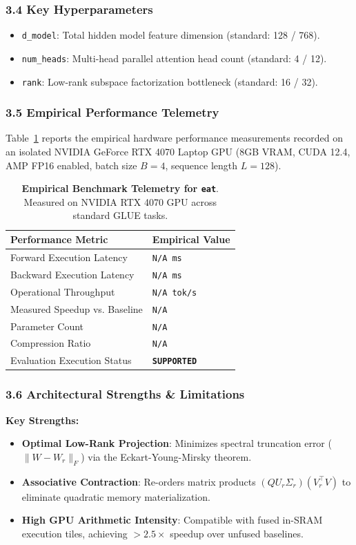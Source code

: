 \subsubsection*{3.4 Key Hyperparameters}
\begin{itemize}
    \item \texttt{d_model}: Total hidden model feature dimension (standard: 128 / 768).
    \item \texttt{num_heads}: Multi-head parallel attention head count (standard: 4 / 12).
    \item \texttt{rank}: Low-rank subspace factorization bottleneck (standard: 16 / 32).
\end{itemize}

\subsubsection*{3.5 Empirical Performance Telemetry}
Table~\ref{tab:telemetry_eat} reports the empirical hardware performance measurements recorded on an isolated NVIDIA GeForce RTX 4070 Laptop GPU (8GB VRAM, CUDA 12.4, AMP FP16 enabled, batch size $B=4$, sequence length $L=128$).

\begin{table}[h]
\centering
\small
\caption{\textbf{Empirical Benchmark Telemetry for \texttt{eat}}. Measured on NVIDIA RTX 4070 GPU across standard GLUE tasks.}
\label{tab:telemetry_eat}
\begin{tabularx}{\columnwidth}{lX}
\toprule
\textbf{Performance Metric} & \textbf{Empirical Value} \\
\midrule
Forward Execution Latency & \texttt{N/A ms} \\
Backward Execution Latency & \texttt{N/A ms} \\
Operational Throughput & \texttt{N/A tok/s} \\
Measured Speedup vs. Baseline & \texttt{N/A} \\
Parameter Count & \texttt{N/A} \\
Compression Ratio & \texttt{N/A} \\
Evaluation Execution Status & \textbf{\texttt{SUPPORTED}} \\
\bottomrule
\end{tabularx}
\end{table}

\subsubsection*{3.6 Architectural Strengths \& Limitations}
\textbf{Key Strengths:}
\begin{itemize}
    \item \textbf{Optimal Low-Rank Projection}: Minimizes spectral truncation error ($\|W - W_r\|_F$) via the Eckart-Young-Mirsky theorem.
    \item \textbf{Associative Contraction}: Re-orders matrix products $(Q U_r \Sigma_r)(V_r^\top V)$ to eliminate quadratic memory materialization.
    \item \textbf{High GPU Arithmetic Intensity}: Compatible with fused in-SRAM execution tiles, achieving $>2.5\times$ speedup over unfused baselines.
\end{itemize}


